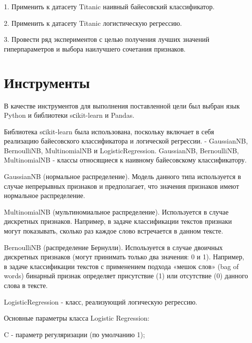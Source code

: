 \documentclass[a4paper,12pt]{article}
\begin{document}
	\vspace{0.1cm}
	1. Применить к датасету Titanic наивный байесовский классификатор.
	
	\vspace{0.1cm}
	2. Применить к датасету Titanic логистическую регрессию.

	\vspace{0.1cm}
	3. Провести ряд экспериментов с целью получения лучших значений гиперпараметров и выбора наилучшего сочетания признаков.
	
\newpage\section{Инструменты} 
	В качестве инструментов для выполнения поставленной цели был выбран язык Python и библиотеки sсikit-learn и Pandas.
	
	\vspace{0.5cm}
	Библиотека sсikit-learn была использована, поскольку включает в себя реализацию байесовского классификатора и логической регрессии. - GaussianNB, BernoulliNB, MultinomialNB и LogisticRegression. GaussianNB, BernoulliNB, MultinomialNB - классы относящиеся к наивному байесовскому классификатору.
	
	\vspace{0.5cm}
	GaussianNB (нормальное распределение). Модель данного типа используется в случае непрерывных признаков и предполагает, что значения признаков имеют нормальное распределение.
	
	\vspace{0.5cm}
	MultinomialNB (мультиномиальное распределение). Используется в случае дискретных признаков. Например, в задаче классификации текстов признаки могут показывать, сколько раз каждое слово встречается в данном тексте.
	
	\vspace{0.5cm}
	BernoulliNB (распределение Бернулли). Используется в случае двоичных дискретных признаков (могут принимать только два значения: 0 и 1). Например, в задаче классификации текстов с применением подхода «мешок слов» (bag of words) бинарный признак определяет присутствие (1) или отсутствие (0) данного слова в тексте.
	
	\vspace{0.5cm}
	LogisticRegression - класс, реализующий логическую регрессию.
	
	\vspace{0.5cm}
	Основные параметры класса Logistic Regression:
	
	\vspace{0.5cm}
	C - параметр регуляризации (по умолчанию 1);
\end{document}
